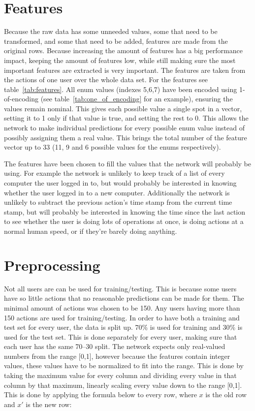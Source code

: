 \section{Features}
Because the raw data has some unneeded values, some that need to be transformed, and some that need to be added, features are made from the original rows. Because increasing the amount of features has a big performance impact, keeping the amount of features low, while still making sure the most important features are extracted is very important. The features are taken from the actions of one user over the whole data set. For the features see table~\ref{tab:features}. All enum values (indexes 5,6,7) have been encoded using 1-of-encoding (see table~\ref{tab:one_of_encoding} for an example), ensuring the values remain nominal. This gives each possible value a single spot in a vector, setting it to 1 only if that value is true, and setting the rest to 0. This allows the network to make individual predictions for every possible enum value instead of possibly assigning them a real value. This brings the total number of the feature vector up to 33 (11, 9 and 6 possible values for the enums respectively).

The features have been chosen to fill the values that the network will probably be using. For example the network is unlikely to keep track of a list of every computer the user logged in to, but would probably be interested in knowing whether the user logged in to a new computer. Additionally the network is unlikely to subtract the previous action's time stamp from the current time stamp, but will probably be interested in knowing the time since the last action to see whether the user is doing lots of operations at once, is doing actions at a normal human speed, or if they're barely doing anything.

\section{Preprocessing}
Not all users are can be used for training/testing. This is because some users have so little actions that no reasonable predictions can be made for them. The minimal amount of actions was chosen to be 150. Any users having more than 150 actions are used for training/testing. In order to have both a training and test set for every user, the data is split up. 70\% is used for training and 30\% is used for the test set. This is done separately for every user, making sure that each user has the same 70--30 split. The network expects only real-valued numbers from the range [0,1], however because the features contain integer values, these values have to be normalized to fit into the range. This is done by taking the maximum value for every column and dividing every value in that column by that maximum, linearly scaling every value down to the range [0,1]. This is done by applying the formula below to every row, where \(x\) is the old row and \(x'\) is the new row:


